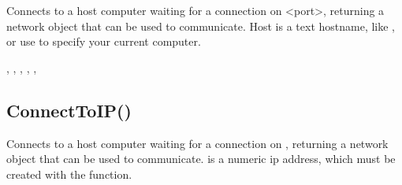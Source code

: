 \documentclass[letterpaper,10pt,english]{sphinxmanual}
\begin{document}
\sphinxAtStartPar
{}

\sphinxAtStartPar
Connects to a host computer waiting for a   connection on \textless{}port\textgreater{}, returning a network object that can be used to   communicate.  Host is a text hostname, like , or   use  to specify your current computer.

\sphinxAtStartPar
{}

\begin{sphinxVerbatim}[commandchars=\\\{\}]
\end{sphinxVerbatim}

\sphinxAtStartPar
{}

\sphinxAtStartPar
{}, ,  , , , 

\ignorespaces 

\subsection{ConnectToIP()}
\label{\detokenize{reference/peblstream:connecttoip}}\label{\detokenize{reference/peblstream:index-5}}
\sphinxAtStartPar
{}

\sphinxAtStartPar
{}

\sphinxAtStartPar
Connects to a host computer waiting for a   connection on , returning a network object that can be used to   communicate.   is a numeric ip address, which must be   created with the  function.

\sphinxAtStartPar
{}

\begin{sphinxVerbatim}[commandchars=\\\{\}]
\end{sphinxVerbatim}
\end{document}
